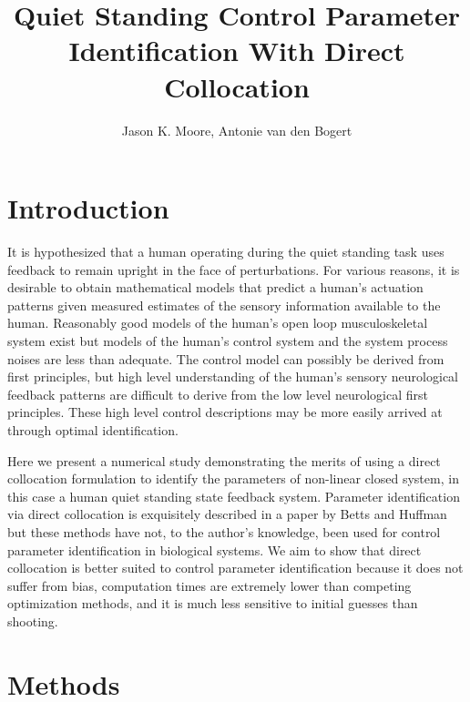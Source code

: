 \documentclass[11pt,a4paper,twocolumn]{article}
\title{Quiet Standing Control Parameter Identification With Direct Collocation}
\author{Jason K. Moore, Antonie van den Bogert}
\date{}
\begin{document}
\maketitle

\section*{Introduction}

It is hypothesized that a human operating during the quiet standing task uses
feedback to remain upright in the face of perturbations. For various reasons,
it is desirable to obtain mathematical models that predict a human's actuation
patterns given measured estimates of the sensory information available to the
human. Reasonably good models of the human's open loop musculoskeletal system
exist but models of the human's control system and the system process noises
are less than adequate. The control model can possibly be derived from first
principles, but high level understanding of the human's sensory neurological
feedback patterns are difficult to derive from the low level neurological first
principles. These high level control descriptions may be more easily arrived at
through optimal identification.

Here we present a numerical study demonstrating the merits of using a direct
collocation formulation to identify the parameters of non-linear closed
system, in this case a human quiet standing state feedback system. Parameter
identification via direct collocation is exquisitely described in a paper by
Betts and Huffman~\cite{Betts2003} but these methods have not, to the author's
knowledge, been used for control parameter identification in biological
systems. We aim to show that direct collocation is better suited to control
parameter identification because it does not suffer from bias, computation
times are extremely lower than competing optimization methods, and it is much
less sensitive to initial guesses than shooting.

\section*{Methods}
\end{document}
